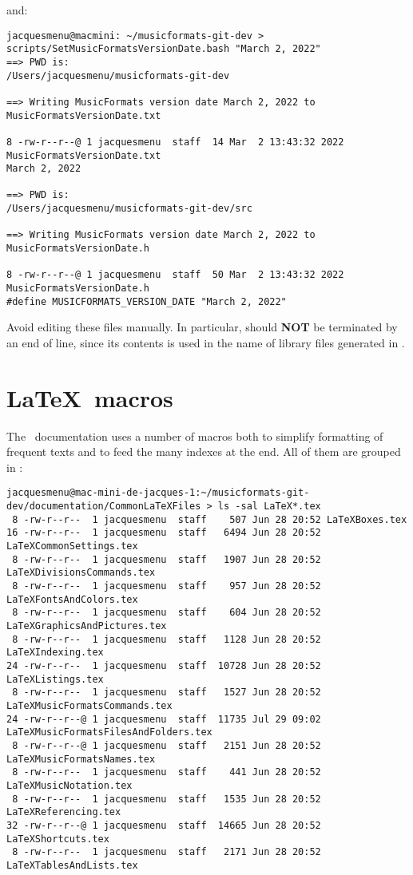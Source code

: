and:

\begin{lstlisting}[language=Terminal]
jacquesmenu@macmini: ~/musicformats-git-dev > scripts/SetMusicFormatsVersionDate.bash "March 2, 2022"
==> PWD is:
/Users/jacquesmenu/musicformats-git-dev

==> Writing MusicFormats version date March 2, 2022 to MusicFormatsVersionDate.txt

8 -rw-r--r--@ 1 jacquesmenu  staff  14 Mar  2 13:43:32 2022 MusicFormatsVersionDate.txt
March 2, 2022

==> PWD is:
/Users/jacquesmenu/musicformats-git-dev/src

==> Writing MusicFormats version date March 2, 2022 to MusicFormatsVersionDate.h

8 -rw-r--r--@ 1 jacquesmenu  staff  50 Mar  2 13:43:32 2022 MusicFormatsVersionDate.h
#define MUSICFORMATS_VERSION_DATE "March 2, 2022"
\end{lstlisting}

Avoid editing these files manually. In particular,  should {\bf NOT} be terminated by an end of line, since its contents is used in the name of library files generated in .


\section{\LaTeX\ macros}

The \mf\ documentation uses a number of macros both to simplify formatting of frequent texts and to feed the many indexes at the end. All of them are grouped in :
\begin{lstlisting}[language=Terminal]
jacquesmenu@mac-mini-de-jacques-1:~/musicformats-git-dev/documentation/CommonLaTeXFiles > ls -sal LaTeX*.tex
 8 -rw-r--r--  1 jacquesmenu  staff    507 Jun 28 20:52 LaTeXBoxes.tex
16 -rw-r--r--  1 jacquesmenu  staff   6494 Jun 28 20:52 LaTeXCommonSettings.tex
 8 -rw-r--r--  1 jacquesmenu  staff   1907 Jun 28 20:52 LaTeXDivisionsCommands.tex
 8 -rw-r--r--  1 jacquesmenu  staff    957 Jun 28 20:52 LaTeXFontsAndColors.tex
 8 -rw-r--r--  1 jacquesmenu  staff    604 Jun 28 20:52 LaTeXGraphicsAndPictures.tex
 8 -rw-r--r--  1 jacquesmenu  staff   1128 Jun 28 20:52 LaTeXIndexing.tex
24 -rw-r--r--  1 jacquesmenu  staff  10728 Jun 28 20:52 LaTeXListings.tex
 8 -rw-r--r--  1 jacquesmenu  staff   1527 Jun 28 20:52 LaTeXMusicFormatsCommands.tex
24 -rw-r--r--@ 1 jacquesmenu  staff  11735 Jul 29 09:02 LaTeXMusicFormatsFilesAndFolders.tex
 8 -rw-r--r--@ 1 jacquesmenu  staff   2151 Jun 28 20:52 LaTeXMusicFormatsNames.tex
 8 -rw-r--r--  1 jacquesmenu  staff    441 Jun 28 20:52 LaTeXMusicNotation.tex
 8 -rw-r--r--  1 jacquesmenu  staff   1535 Jun 28 20:52 LaTeXReferencing.tex
32 -rw-r--r--@ 1 jacquesmenu  staff  14665 Jun 28 20:52 LaTeXShortcuts.tex
 8 -rw-r--r--  1 jacquesmenu  staff   2171 Jun 28 20:52 LaTeXTablesAndLists.tex
\end{lstlisting}

